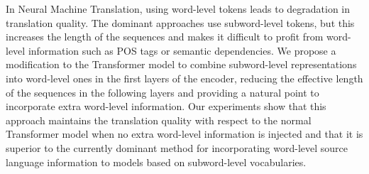 In Neural Machine Translation, using word-level tokens leads to degradation in translation quality. The dominant approaches use subword-level tokens, but this increases the length of the sequences and makes it difficult to profit from word-level information such as POS tags or semantic dependencies. We propose a modification to the Transformer model to combine subword-level representations into word-level ones in the first layers of the encoder, reducing the effective length of the sequences in the following layers and providing a natural point to incorporate extra word-level information. Our experiments show that this approach maintains the translation quality with respect to the normal Transformer model when no extra word-level information is injected and that it is superior to the currently dominant method for incorporating word-level source language information to models based on subword-level vocabularies.
